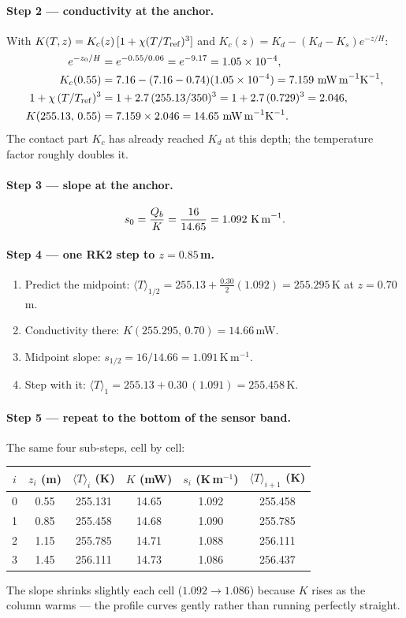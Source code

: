 \documentclass[11pt]{report}
\newcommand{\Tm}{\langle T\rangle}
\begin{document}
\paragraph{Step 2 --- conductivity at the anchor.}
With $K(T,z)=K_c(z)\,[1+\chi(T/T_{\rm ref})^3]$ and $K_c(z)=K_d-(K_d-K_s)e^{-z/H}$:
\begin{align*}
e^{-z_0/H}&=e^{-0.55/0.06}=e^{-9.17}=1.05\times10^{-4},\\
K_c(0.55)&=7.16-(7.16-0.74)(1.05\times10^{-4})=7.159\ \text{mW\,m}^{-1}\text{K}^{-1},\\
1+\chi\,(T/T_{\rm ref})^3&=1+2.7\,(255.13/350)^3=1+2.7\,(0.729)^3=2.046,\\
K(255.13,\,0.55)&=7.159\times2.046=14.65\ \text{mW\,m}^{-1}\text{K}^{-1}.
\end{align*}
The contact part $K_c$ has already reached $K_d$ at this depth; the temperature
factor roughly doubles it.

\paragraph{Step 3 --- slope at the anchor.}
\[
s_0=\frac{Q_b}{K}=\frac{16}{14.65}=1.092\ \text{K\,m}^{-1} .
\]

\paragraph{Step 4 --- one RK2 step to $z=0.85$\,m.}
\begin{enumerate}[label=(\roman*),leftmargin=2.2em,itemsep=1pt]
\item Predict the midpoint: $\Tm_{1/2}=255.13+\tfrac{0.30}{2}(1.092)=255.295$\,K at $z=0.70$\,m.
\item Conductivity there: $K(255.295,\,0.70)=14.66$\,mW.
\item Midpoint slope: $s_{1/2}=16/14.66=1.091$\,K\,m$^{-1}$.
\item Step with it: $\Tm_1=255.13+0.30\,(1.091)=255.458$\,K.
\end{enumerate}

\paragraph{Step 5 --- repeat to the bottom of the sensor band.}
The same four sub-steps, cell by cell:
\begin{center}\small
\begin{tabular}{@{}cccccc@{}}
\toprule
$i$ & $z_i$ (m) & $\Tm_i$ (K) & $K$ (mW) & $s_i$ (K\,m$^{-1}$) & $\Tm_{i+1}$ (K) \\
\midrule
0 & 0.55 & 255.131 & 14.65 & 1.092 & 255.458 \\
1 & 0.85 & 255.458 & 14.68 & 1.090 & 255.785 \\
2 & 1.15 & 255.785 & 14.71 & 1.088 & 256.111 \\
3 & 1.45 & 256.111 & 14.73 & 1.086 & 256.437 \\
\bottomrule
\end{tabular}
\end{center}
\noindent The slope shrinks slightly each cell ($1.092\to1.086$) because $K$ rises as
the column warms --- the profile curves gently rather than running perfectly straight.
\end{document}
